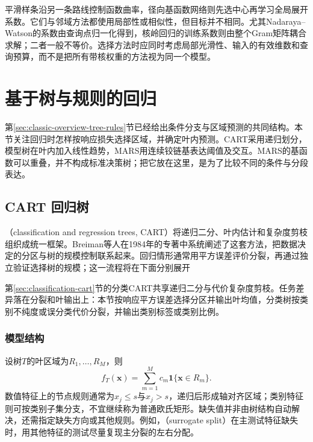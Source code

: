 平滑样条沿另一条路线控制函数曲率，径向基函数网络则先选中心再学习全局展开系数。它们与邻域方法都使用局部性或相似性，但目标并不相同。尤其Nadaraya--Watson的系数由查询点归一化得到，核岭回归的训练系数则由整个Gram矩阵耦合求解；二者一般不等价。选择方法时应同时考虑局部光滑性、输入的有效维数和查询预算，而不是把所有带核权重的方法视为同一个模型。

\section{基于树与规则的回归}
\label{sec:regression-trees}

第\ref{sec:classic-overview-tree-rules}节已经给出条件分支与区域预测的共同结构。本节关注回归时怎样按响应损失选择区域，并确定叶内预测。CART采用递归划分，模型树在叶内加入线性趋势，MARS用连续铰链基表达阈值及交互。MARS的基函数可以重叠，并不构成标准决策树；把它放在这里，是为了比较不同的条件与分段表达。

\subsection{CART 回归树}
\label{sec:regression-cart}

（classification and regression trees, CART）将递归二分、叶内估计和复杂度剪枝组织成统一框架。Breiman等人在1984年的专著中系统阐述了这套方法，把数据决定的分区与树的规模控制联系起来。回归情形通常用平方误差评价分裂，再通过独立验证选择树的规模；这一流程将在下面分别展开

第\ref{sec:classification-cart}节的分类CART共享递归二分与代价复杂度剪枝。任务差异落在分裂和叶输出上：本节按响应平方误差选择分区并输出叶均值，分类树按类别不纯度或误分类代价分裂，并输出类别标签或类别比例。

\subsubsection{模型结构}

设树$T$的叶区域为$R_1,\ldots,R_M$，则
\begin{equation}
  f_T(\bm{x})=\sum_{m=1}^{M}c_m\mathbf{1}\{\bm{x}\in R_m\}.
  \label{eq:regression-cart-model}
\end{equation}
数值特征上的节点规则通常为$x_j\leq s$与$x_j>s$，递归后形成轴对齐区域；类别特征则可按类别子集分支，不宜继续称为普通欧氏矩形。缺失值并非由树结构自动解决，还需指定缺失方向或其他规则。例如，（surrogate split）在主测试特征缺失时，用其他特征的测试尽量复现主分裂的左右分配。


